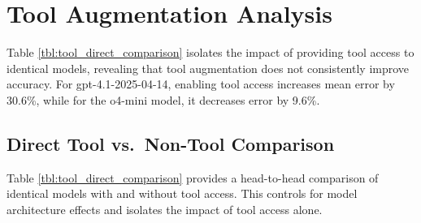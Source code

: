 \section{Tool Augmentation
Analysis}\label{appendix-d-tool-augmentation-analysis}

Table \ref{tbl:tool_direct_comparison} isolates the impact of providing
tool access to identical models, revealing that tool augmentation does
not consistently improve accuracy. For gpt-4.1-2025-04-14, enabling tool
access increases mean error by 30.6\%, while for the o4-mini model, it
decreases error by 9.6\%.

\subsection{Direct Tool vs.~Non-Tool
Comparison}\label{d.1-direct-tool-vs.-non-tool-comparison}

Table \ref{tbl:tool_direct_comparison} provides a head-to-head
comparison of identical models with and without tool access. This
controls for model architecture effects and isolates the impact of tool
access alone.

